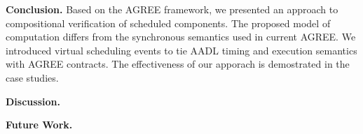{\bf Conclusion.}
Based on the AGREE framework, we presented an approach to compositional verification of scheduled components. The proposed model of computation differs from the synchronous semantics used in current AGREE. We introduced virtual scheduling events to tie AADL timing and execution semantics with AGREE contracts. The effectiveness of our apporach is demostrated in the case studies.

{\bf Discussion.}

{\bf Future Work.}
